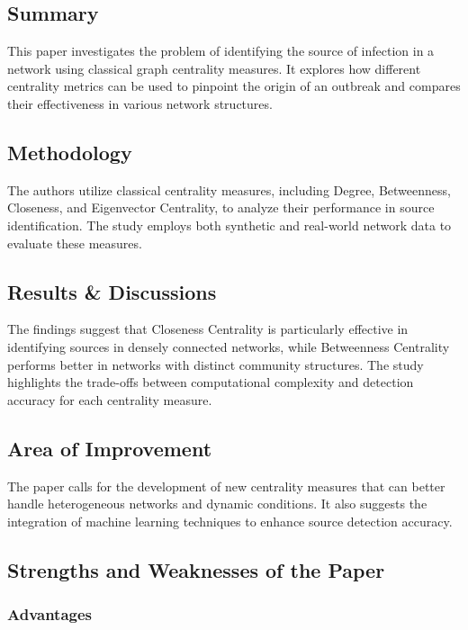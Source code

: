 \subsection{Summary}

This paper investigates the problem of identifying the source of infection in a network using classical graph centrality measures. It explores how different centrality metrics can be used to pinpoint the origin of an outbreak and compares their effectiveness in various network structures.

\subsection{Methodology}

The authors utilize classical centrality measures, including Degree, Betweenness, Closeness, and Eigenvector Centrality, to analyze their performance in source identification. The study employs both synthetic and real-world network data to evaluate these measures.

\subsection{Results \& Discussions}

The findings suggest that Closeness Centrality is particularly effective in identifying sources in densely connected networks, while Betweenness Centrality performs better in networks with distinct community structures. The study highlights the trade-offs between computational complexity and detection accuracy for each centrality measure.

\subsection{Area of Improvement}

The paper calls for the development of new centrality measures that can better handle heterogeneous networks and dynamic conditions. It also suggests the integration of machine learning techniques to enhance source detection accuracy.

\subsection{Strengths and Weaknesses of the Paper}

\subsubsection{Advantages}


